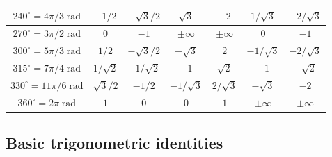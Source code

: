 \documentclass{article}
\begin{document}
\begin{tabular}{|c||c|c||c|c||c|c|}
\hline
\(240^\circ = 4\pi/3\;\text{rad}\)   & \(-1/2\)              & \(-\sqrt{3}/2\)    & \(\sqrt{3}\)      & \(-2\)                & \(1/\sqrt{3}\)  & \(-2/\sqrt{3}\) \\
\hline
\(270^\circ = 3\pi/2\;\text{rad}\)   & \(0\)                 & \(-1\)                    & \(\pm\infty\)    & \(\pm\infty\)     & \(0\)                 & \(-1\)               \\
\hline
\(300^\circ = 5\pi/3\;\text{rad}\)   & \(1/2\)             & \(-\sqrt{3}/2\)      & \(-\sqrt{3}\)    & \(2\)                 & \(-1/\sqrt{3}\) & \(-2/\sqrt{3}\) \\
\hline
\(315^\circ = 7\pi/4\;\text{rad}\)   & \(1/\sqrt{2}\)  & \(-1/\sqrt{2}\)      & \(-1\)               & \(\sqrt{2}\)      & \(-1\)               & \(-\sqrt{2}\)     \\
\hline
\(330^\circ = 11\pi/6\;\text{rad}\) & \(\sqrt{3}/2\)  & \(-1/2\)                 & \(-1/\sqrt{3}\) & \(2/\sqrt{3}\)  & \(-\sqrt{3}\)    & \(-2\)                \\
\hline
\(360^\circ = 2\pi\;\text{rad}\)      & \(1\)                 & \(0\)                    & \(0\)                  & \(1\)                & \(\pm\infty\)   & \(\pm\infty\)      \\
\hline
\end{tabular}



\subsection{Basic trigonometric identities}
\end{document}
